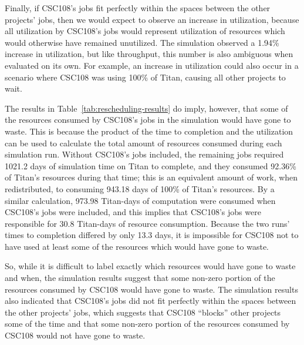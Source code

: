 Finally, if CSC108's jobs fit perfectly within the spaces between the other
projects' jobs, then we would expect to observe an increase in utilization,
because all utilization by CSC108's jobs would represent utilization of
resources which would otherwise have remained unutilized. The simulation
observed a 1.94\% increase in utilization, but like throughput, this number is
also ambiguous when evaluated on its own. For example, an increase in
utilization could also occur in a scenario where CSC108 was using 100\% of
Titan, causing all other projects to wait.

The results in Table~\ref{tab:rescheduling-results} do imply, however, that
some of the resources consumed by CSC108's jobs in the simulation would have
gone to waste. This is because the product of the time to completion and the
utilization can be used to calculate the total amount of resources consumed
during each simulation run. Without CSC108's jobs included, the remaining jobs
required 1021.2 days of simulation time on Titan to complete, and they consumed
92.36\% of Titan's resources during that time; this is an equivalent amount of
work, when redistributed, to consuming 943.18 days of 100\% of Titan's
resources. By a similar calculation, 973.98 Titan-days of computation were
consumed when CSC108's jobs were included, and this implies that CSC108's jobs
were responsible for 30.8 Titan-days of resource consumption. Because the two
runs' times to completion differed by only 13.3 days, it is impossible for
CSC108 not to have used at least some of the resources which would have gone to
waste.

So, while it is difficult to label exactly which resources would have gone to
waste and when, the simulation results suggest that some non-zero portion of
the resources consumed by CSC108 would have gone to waste. The simulation
results also indicated that CSC108's jobs did not fit perfectly within the
spaces between the other projects' jobs, which suggests that CSC108 ``blocks''
other projects some of the time and that some non-zero portion of the resources
consumed by CSC108 would not have gone to waste.


